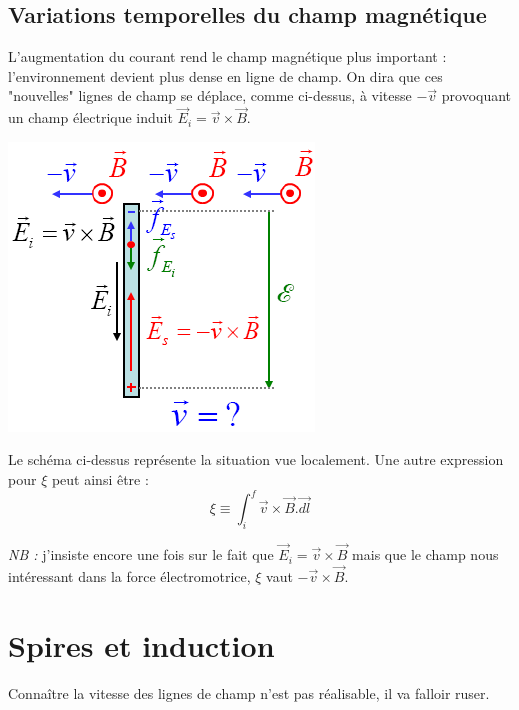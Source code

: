 \documentclass	[11pt, a4paper, openany]{book}
\begin{document}
\subsection{Variations temporelles du champ magnétique}
L'augmentation du courant rend le champ magnétique plus important : l'environnement devient plus dense en ligne de champ. On dira que ces "nouvelles" lignes de champ se déplace, comme ci-dessus, à vitesse $-\vec{v}$ provoquant un champ électrique induit $\vec{E}_i = \vec{v} \times \vec{B}$.
\begin{center}
\includegraphics[scale=0.45]{em/image7.png}\\
\end{center}
Le schéma ci-dessus représente la situation vue localement. Une autre expression pour $\xi$ peut ainsi être :
\begin{equation}
\xi \equiv \int_i^f \vec{v} \times \vec{B}.\vec{dl}
\end{equation}


\textit{NB :} j'insiste encore une fois sur le fait que $\vec{E}_i = \vec{v} \times \vec{B}$ mais que le champ nous intéressant dans la force électromotrice, $\xi$ vaut $-\vec{v} \times \vec{B}$.


\section{Spires et induction}
Connaître la vitesse des lignes de champ n'est pas réalisable, il va falloir ruser.
\end{document}
